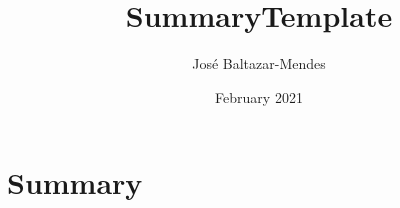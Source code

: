\documentclass{article}
\title{SummaryTemplate}
\author{José Baltazar-Mendes}
\date{February 2021}
\begin{document}
\maketitle

\section*{Summary}





\end{document}
